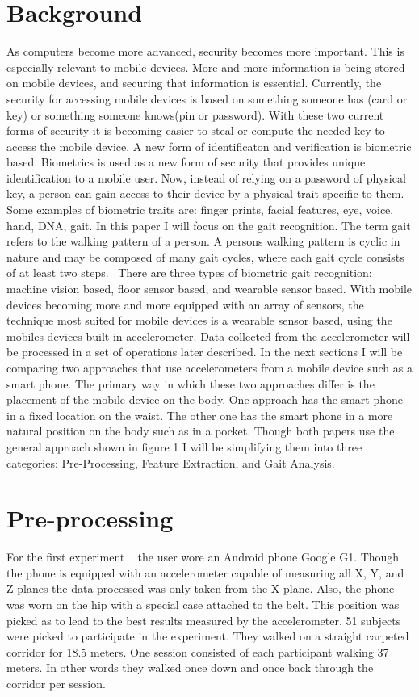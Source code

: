 \documentclass{sig-alternate}
\begin{document}
\section{Background}
	As computers become more advanced, security becomes more important. This is especially relevant to mobile devices. More and more information is being stored on mobile devices, and securing that information is essential. Currently, the security for accessing mobile devices is based on something someone has (card or key) or something someone knows(pin or password). With these two current forms of security it is becoming easier to steal or compute the needed key to access the mobile device. 
		A new form of identificaton and verification is biometric based. Biometrics is used as a new form of security that provides unique identification to a mobile user. Now, instead of relying on a password of physical key, a person can gain access to their device by a physical trait specific to them. Some examples of biometric traits are: finger prints, facial features, eye, voice, hand, DNA, gait. In this paper I will focus on the gait recognition. The term gait refers to the walking pattern of a person. A persons walking pattern is cyclic in nature and may be composed of many gait cycles, where each gait cycle consists of at least two steps.~\cite{Sujithra:2012} 
			There are three types of biometric gait recognition: machine vision based, floor sensor based, and wearable sensor based. With mobile devices becoming more and more equipped with an array of sensors, the technique most suited for mobile devices is a wearable sensor based, using the mobiles devices built-in accelerometer. Data collected from the accelerometer will be processed in a set of operations later described. 
	In the next sections I will be comparing two approaches that use accelerometers from a mobile device such as a smart phone. The primary way in which these two approaches differ is the placement of the mobile device on the body. One approach has the smart phone in a fixed location on the waist. The other one has the smart phone in a more natural position on the body such as in a pocket. Though both papers use the general approach shown in figure 1 I will be simplifying them into three categories: Pre-Processing, Feature Extraction, and Gait Analysis. 

\section{Pre-processing} 
For the first experiment ~\cite{Muaaz:2013} the user wore an Android phone Google G1. Though the phone is equipped with an accelerometer capable of measuring all X, Y, and Z planes the data processed was only taken from the X plane. Also, the phone was worn on the hip with a special case attached to the belt. This position was picked as to lead to the best results measured by the accelerometer. 51 subjects were picked to participate in the experiment. They walked on a straight carpeted corridor for 18.5 meters. One session consisted of each participant walking 37 meters. In other words they walked once down and once back through the corridor per session. 
\end{document}
